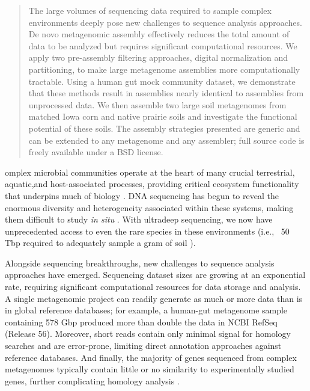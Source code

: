 \documentclass{pnastwo}
\begin{document}
\begin{article} \begin{abstract} The large volumes of sequencing data required
to sample complex environments deeply pose new challenges to sequence analysis
approaches. De novo metagenomic assembly effectively reduces the total amount of
data to be analyzed but requires significant computational resources. We apply
two pre-assembly filtering approaches, digital normalization and partitioning,
to make large metagenome assemblies more computationally tractable. Using a
human gut mock community dataset, we demonstrate that these methods result in
assemblies nearly identical to assemblies from unprocessed data. We then
assemble two large soil metagenomes from matched Iowa corn and native prairie
soils and investigate the functional potential of these soils.  The
assembly strategies presented are generic and can be extended to any metagenome
and any assembler; full source code is freely available under a BSD license.
\end{abstract}


omplex microbial communities operate at the heart of many crucial
terrestrial, aquatic,and host-associated processes, providing critical ecosystem
functionality that underpins much of biology
\cite{Arumugam:2011p735,Hess:2011p686,Iverson:2012p1281,
Mackelprang:2011p1087,Qin:2010p189,Tringe:2005p174,Venter:2004p170}. DNA
sequencing has begun to reveal the enormous diversity and heterogeneity
associated within these systems, making them difficult to study {\em in situ}
\cite{Hess:2011p686,Mackelprang:2011p1087,Qin:2010p189}. With ultradeep
sequencing, we now have unprecedented access to even the rare species in these
environments (i.e., ~50 Tbp required to adequately sample a gram of soil
\cite{Gans:2005p1365}).

Alongside sequencing breakthroughs, new challenges to sequence analysis
approaches have emerged. Sequencing dataset sizes are growing at an exponential
rate, requiring significant computational resources for data storage and
analysis. A single metagenomic project can readily generate as much or more data
than is in global reference databases; for example, a human-gut metagenome sample
containing 578 Gbp \cite{Qin:2010p189} produced more than double the data in NCBI
RefSeq (Release 56). Moreover, short reads contain only minimal signal for
homology searches and are error-prone, limiting direct annotation approaches
against reference databases. And finally, the majority of genes sequenced from
complex metagenomes typically contain little or no similarity to experimentally
studied genes, further complicating homology analysis
\cite{Arumugam:2011p735,Qin:2010p189}.


\end{article}
\end{document}
